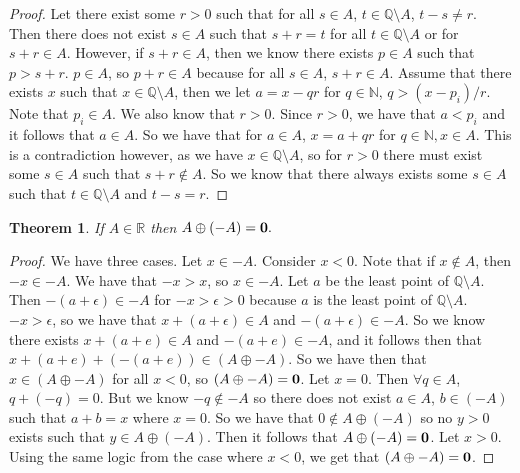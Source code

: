 \documentclass[12pt]{article}
\newcommand{\bbN}{\mathbb{N}}
\newcommand{\bbQ}{\mathbb{Q}}
\newcommand{\bbR}{\mathbb{R}}
\renewcommand{\_}[1]{\underline{ #1 }}
\newtheorem{theorem}{Theorem}[section]
\theoremstyle{definition}
\numberwithin{equation}{subsection}
\begin{document}
\begin{proof}
Let there exist some $r > 0$ such that for all $s \in A$, $t \in \bbQ \setminus A$, $t - s \not = r$. Then there does not exist $s \in A$ such that $s + r = t$ for all $t \in \bbQ \setminus A$ or for $s + r \in A$. However, if $s + r \in A$, then we know there exists $p \in A$ such that $p > s + r$. $p \in A$, so $p + r \in A$ because for all $s \in A$, $s + r \in A$. Assume that there exists $x$ such that $x \in \bbQ \setminus A$, then we let $a = x - qr$ for $q \in \bbN$, $q > (x - p_i)/r$. Note that $p_i \in A$. We also know that $r > 0$. Since $r > 0$, we have that $a < p_i$ and it follows that $a \in A$. So we have that for $a \in A$, $x = a + qr$ for $q \in \bbN, x \in A$. This is a contradiction however, as we have $x \in \bbQ \setminus A$, so for $r > 0$ there must exist some $s \in A$ such that $s + r \not \in A$. So we know that there always exists some $s \in A$ such that $t \in \bbQ \setminus A$ and $t - s = r$.
\end{proof}

\begin{theorem}
If $A\in\bbR$ then $A\oplus (-A)={\bf 0}.$ 
\end{theorem}

\begin{proof}
We have three cases. Let $x \in -A$. \newline
Consider $x < 0$. Note that if $x \not \in A$, then $-x \in -A$. We have that $-x > x$, so $x \in -A$. Let $a$ be the least point of $\bbQ \setminus A$. Then $-(a + \epsilon) \in -A$ for $-x > \epsilon > 0$ because $a$ is the least point of $\bbQ \setminus A$. $-x > \epsilon$, so we have that $x + (a + \epsilon) \in A$ and $-(a + \epsilon) \in -A$. So we know there exists $x + (a + e) \in A$ and $-(a + e) \in -A$, and it follows then that $x + (a + e) + (-(a + e)) \in (A \oplus -A)$. So we have then that $x \in (A \oplus -A)$ for all $x < 0$, so $(A \oplus -A) = {\bf 0}$. \newline
Let $x = 0$. Then $\forall q \in A$, $q + (-q) = 0$. But we know $-q \not \in -A$ so there does not exist $a \in A$, $b \in (-A)$ such that $a + b = x$ where $x = 0$. So we have that $0 \not \in A \oplus (-A)$ so no $y > 0$ exists such that $y \in A \oplus (-A)$. Then it follows that $A \oplus (-A) = {\bf 0}$. \newline
Let $x > 0$. Using the same logic from the case where $x < 0$, we get that $(A \oplus -A) = {\bf 0}$. 
\end{proof}
\end{document}
